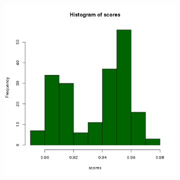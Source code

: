 \documentclass[11pt,a4paper]{article}
\begin{document}
\begin{figure}
\begin{subfigure}{.5\textwidth}
        \includegraphics[width=\textwidth]{images/hist-freq-n7-a43-chrome-200-amostras-20131120}
        \label{nexus43histograma200}
    \end{subfigure}
\end{figure}
\end{document}
